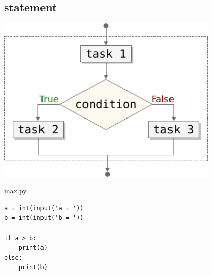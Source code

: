 \documentclass[aspectratio=1610,t]{beamer}
\begin{document}
\subsection{ statement}
\begin{pframe}
 \begin{minipage}{0.47\textwidth}
 \begin{center}
   \includegraphics[width=0.80\textwidth]{../../images/flow_conditional.pdf}
 \end{center}
 \end{minipage}%
 \begin{minipage}{0.47\textwidth}
 \begin{pythonfile}{max.py}
  \begin{verbatim}
a = int(input('a = '))
b = int(input('b = '))

if a > b:
    print(a)
else:
    print(b)
  \end{verbatim}
 \end{pythonfile}

 \begin{terminal}
 \end{terminal}
 \end{minipage}
\end{pframe}
\end{document}
